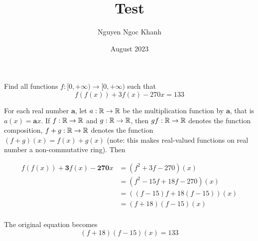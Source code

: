 \documentclass{article}
\title{
    Test
}
\author{Nguyen Ngoc Khanh}
\date{August 2023}
\begin{document}
Find all functions $f: [0, +\infty) \to [0, +\infty)$ such that
$$
	f(f(x)) + 3 f(x) - 270 x = 133
$$

For each real number $\mathbf{a}$, let $a: \mathbb{R} \to \mathbb{R}$ be the multiplication function by $\mathbf{a}$, that is $a(x) =  \mathbf{a}x$. If $f: \mathbb{R} \to \mathbb{R}$ and $g: \mathbb{R} \to \mathbb{R}$, then $gf: \mathbb{R} \to \mathbb{R}$ denotes the function composition, $f+g: \mathbb{R} \to \mathbb{R}$ denotes the function $(f+g)(x) = f(x) + g(x)$ (note: this makes real-valued functions on real number a non-commutative ring). Then

\begin{align*}
	f(f(x)) + \mathbf{3} f(x) - \mathbf{270} x
	&= (f^2 + 3f - 270)(x) \\
	&= (f^2 - 15f + 18f - 270)(x) \\
	&= ((f - 15)f + 18(f - 15))(x) \\
	&= (f + 18)(f - 15)(x) \\
\end{align*}

The original equation becomes
$$
	(f + 18)(f - 15)(x) = 133
$$
\end{document}
